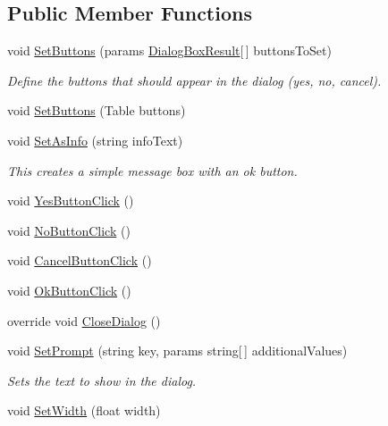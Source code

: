 \subsection*{Public Member Functions}
\begin{DoxyCompactItemize}
\item 
void \hyperlink{class_dialog_box_prompt_or_info_a451eae3b87295695885d74c3cab62e47}{Set\+Buttons} (params \hyperlink{_dialog_box_result_8cs_acd933b66f7b1c8ad36ee61780622c54f}{Dialog\+Box\+Result}\mbox{[}$\,$\mbox{]} buttons\+To\+Set)
\begin{DoxyCompactList}\small\item\em Define the buttons that should appear in the dialog (yes, no, cancel). \end{DoxyCompactList}\item 
void \hyperlink{class_dialog_box_prompt_or_info_ae28253797d0c08cdebb1e61782861766}{Set\+Buttons} (Table buttons)
\item 
void \hyperlink{class_dialog_box_prompt_or_info_a591120ef3e537b3c237cffa980db3fdf}{Set\+As\+Info} (string info\+Text)
\begin{DoxyCompactList}\small\item\em This creates a simple message box with an ok button. \end{DoxyCompactList}\item 
void \hyperlink{class_dialog_box_prompt_or_info_aeaefe36074973518526bf7ad4cb9c034}{Yes\+Button\+Click} ()
\item 
void \hyperlink{class_dialog_box_prompt_or_info_a8f81842e512aa487b54926ae31422dc0}{No\+Button\+Click} ()
\item 
void \hyperlink{class_dialog_box_prompt_or_info_a085993f7345873bb6cdc71c0f0ca955e}{Cancel\+Button\+Click} ()
\item 
void \hyperlink{class_dialog_box_prompt_or_info_a7e675056ad6c03b07fbf34f906db1c47}{Ok\+Button\+Click} ()
\item 
override void \hyperlink{class_dialog_box_prompt_or_info_a43847039bc30df2a99bad373312fcffb}{Close\+Dialog} ()
\item 
void \hyperlink{class_dialog_box_prompt_or_info_a0073f1ea17e3a1fa1aa4735082d29034}{Set\+Prompt} (string key, params string\mbox{[}$\,$\mbox{]} additional\+Values)
\begin{DoxyCompactList}\small\item\em Sets the text to show in the dialog. \end{DoxyCompactList}\item 
void \hyperlink{class_dialog_box_prompt_or_info_a241847fb9d325f044bd7ee383ad1282b}{Set\+Width} (float width)
\end{DoxyCompactItemize}
